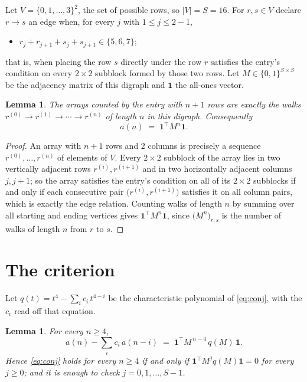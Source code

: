 \documentclass[11pt,a4paper]{article}
\theoremstyle{plain}
\newtheorem{lemma}[theorem]{Lemma}
\theoremstyle{definition}
\begin{document}
Let $V=\{0,1,\dots,3\}^{2}$, the set of possible rows, so $|V|=S=16$. For
$r,s\in V$ declare $r\to s$ an edge when, for every $j$ with $1\le j\le 2-1$,
\begin{itemize}
\item $r_j+r_{j+1}+s_j+s_{j+1}\in\{5, 6, 7\}$;

\end{itemize}
that is, when placing the row $s$ directly under the row $r$ satisfies the entry's
condition on every $2\times2$ subblock formed by those two rows. Let $M\in\{0,1\}^{S\times
S}$ be the adjacency matrix of this digraph and $\mathbf{1}$ the all-ones vector.

\begin{lemma}\label{lem:walk}
The arrays counted by the entry with $n+1$ rows are exactly the walks
$r^{(0)}\to r^{(1)}\to\cdots\to r^{(n)}$ of length $n$ in this digraph. Consequently
\[
a(n)\;=\;\mathbf{1}^{\!\top}M^{n}\mathbf{1} .
\]
\end{lemma}

\begin{proof}
An array with $n+1$ rows and $2$ columns is precisely a sequence
$r^{(0)},\dots,r^{(n)}$ of elements of $V$. Every $2\times2$ subblock of the array lies
in two vertically adjacent rows $r^{(i)},r^{(i+1)}$ and in two horizontally adjacent
columns $j,j+1$; so the array satisfies the entry's condition on all of its $2\times2$
subblocks if and only if each consecutive pair $\bigl(r^{(i)},r^{(i+1)}\bigr)$ satisfies
it on all column pairs, which is exactly the edge relation. Counting walks of length $n$ by
summing over all starting and ending vertices gives
$\mathbf{1}^{\!\top}M^{n}\mathbf{1}$, since
$\bigl(M^{n}\bigr)_{r,s}$ is the number of walks of length $n$ from $r$ to $s$.
\end{proof}

\section{The criterion}

Let $q(t)=t^{4}-\sum_{i}c_i\,t^{4-i}$ be the characteristic polynomial of
\eqref{eq:conj}, with the $c_i$ read off that equation.

\begin{lemma}\label{lem:crit}
For every $n\ge4$,
\[
a(n)-\sum_i c_i\,a(n-i)\;=\;\mathbf{1}^{\!\top}M^{\,n-4}\,q(M)\,\mathbf{1} .
\]
Hence \eqref{eq:conj} holds for every $n\ge4$ if and only if
$\mathbf{1}^{\!\top}M^{j}q(M)\mathbf{1}=0$ for every $j\ge0$; and it is enough to
check $j=0,1,\dots,S-1$.
\end{lemma}
\end{document}
